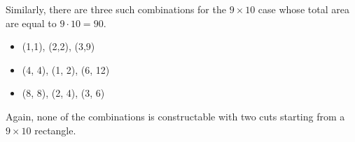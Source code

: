 \begin{solution}
Similarly, there are three such combinations for the $9 \times 10$ case whose total area are equal to $9\cdot 10=90$.
\begin{itemize}
	\item (1,1), (2,2), (3,9)
	\item (4, 4), (1, 2), (6, 12)
	\item (8, 8), (2, 4), (3, 6)
\end{itemize}
Again, none of the combinations is constructable with two cuts starting from a $9 \times 10$ rectangle.
\end{solution}
